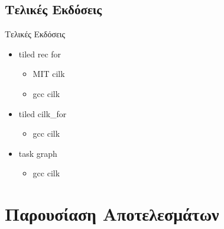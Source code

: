 \documentclass{beamer}
\begin{document}
\subsection{Τελικές Εκδόσεις}
\begin{frame}{Τελικές Εκδόσεις}
    \begin{itemize}
        \item<1-> tiled rec for
            \begin{itemize}
                \item<2-> MIT cilk
                \item<3-> gcc cilk
            \end{itemize}
        \item<4-> tiled cilk\_for
            \begin{itemize}
                \item<5-> gcc cilk
            \end{itemize}
        \item<6-> task graph
            \begin{itemize}
                \item<7-> gcc cilk
            \end{itemize}
    \end{itemize}
\end{frame}



\section{Παρουσίαση Αποτελεσμάτων}
\end{document}

